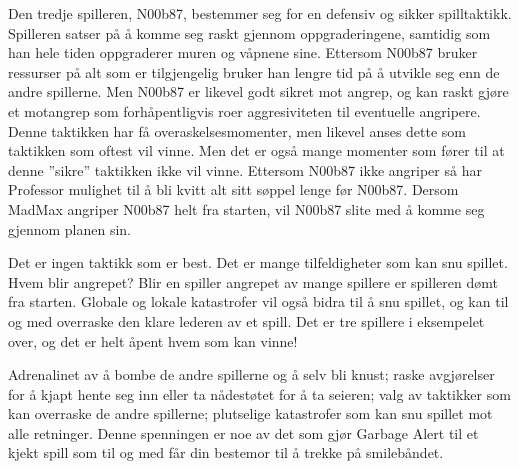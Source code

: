 Den tredje spilleren, N00b87, bestemmer seg for en defensiv og sikker spilltaktikk. Spilleren satser på å komme seg raskt gjennom oppgraderingene, samtidig som han hele tiden oppgraderer muren og våpnene sine. Ettersom N00b87 bruker ressurser på alt som er tilgjengelig bruker han lengre tid på å utvikle seg enn de andre spillerne. Men N00b87 er likevel godt sikret mot angrep, og kan raskt gjøre et motangrep som forhåpentligvis roer aggresiviteten til eventuelle angripere. Denne taktikken har få overaskelsesmomenter, men likevel anses dette som taktikken som oftest vil vinne. Men det er også mange momenter som fører til at denne ''sikre'' taktikken ikke vil vinne. Ettersom N00b87 ikke angriper så har Professor mulighet til å bli kvitt alt sitt søppel lenge før N00b87. Dersom MadMax angriper N00b87 helt fra starten, vil N00b87 slite med å komme seg gjennom planen sin. 

Det er ingen taktikk som er best. Det er mange tilfeldigheter som kan snu spillet. Hvem blir angrepet? Blir en spiller angrepet av mange spillere er spilleren dømt fra starten. Globale og lokale katastrofer vil også bidra til å snu spillet, og kan til og med overraske den klare lederen av et spill. Det er tre spillere i eksempelet over, og det er helt åpent hvem som kan vinne!

Adrenalinet av å bombe de andre spillerne og å selv bli knust; raske avgjørelser for å kjapt hente seg inn eller ta nådestøtet for å ta seieren; valg av taktikker som kan overraske de andre spillerne; plutselige katastrofer som kan snu spillet mot alle retninger. Denne spenningen er noe av det som gjør Garbage Alert til et kjekt spill som til og med får din bestemor til å trekke på smilebåndet.


